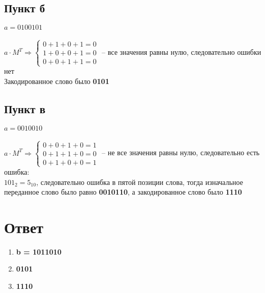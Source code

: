\documentclass{article}
\begin{document}
\subsection*{Пункт б}
$a = 0100101$\\\\
$a \cdot M^T \Rightarrow
\begin{cases}
    0 + 1 + 0 + 1 = 0 \\
    1 + 0 + 0 + 1 = 0 \\
    0 + 0 + 1 + 1 = 0
\end{cases}
$
-- все значения равны нулю, следовательно ошибки нет
\\
Закодированное слово было \textbf{0101}

\subsection*{Пункт в}
$a = 0010010$
\\\\
$a \cdot M^T \Rightarrow
\begin{cases}
    0 + 0 + 1 + 0 = 1 \\
    0 + 1 + 1 + 0 = 0 \\
    0 + 1 + 0 + 0 = 1
\end{cases}
$
-- не все значения равны нулю, следовательно есть ошибка:\\
$101_2 = 5_{10}$, следовательно ошибка в пятой позиции слова, тогда
изначальное переданное слово было равно \textbf{0010110}, а закодированное
слово было \textbf{1110}


\section*{Ответ}
\begin{enumerate}
    \item \textbf{b = 1011010}
    \item \textbf{0101}
    \item \textbf{1110} 
\end{enumerate}
\end{document}
